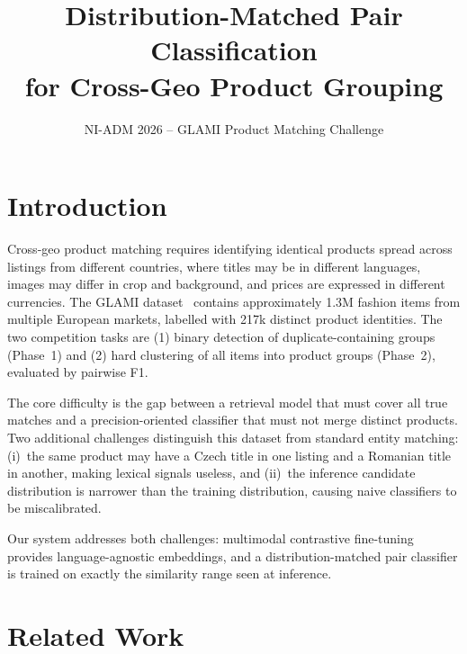 \documentclass[10pt,twocolumn]{article}
\title{\textbf{Distribution-Matched Pair Classification\\for Cross-Geo Product Grouping}}
\author{NI-ADM 2026 -- GLAMI Product Matching Challenge}
\date{}
\begin{document}
\maketitle
\thispagestyle{empty}

\section{Introduction}

Cross-geo product matching requires identifying identical products spread
across listings from different countries, where titles may be in different
languages, images may differ in crop and background, and prices are expressed
in different currencies.
The GLAMI dataset~\cite{glami} contains approximately 1.3M fashion items from
multiple European markets, labelled with 217k distinct product identities.
The two competition tasks are (1) binary detection of duplicate-containing
groups (Phase~1) and (2) hard clustering of all items into product groups
(Phase~2), evaluated by pairwise F1.

The core difficulty is the gap between a retrieval model that must cover all
true matches and a precision-oriented classifier that must not merge distinct
products. Two additional challenges distinguish this dataset from standard
entity matching: (i)~the same product may have a Czech title in one listing
and a Romanian title in another, making lexical signals useless, and (ii)~the
inference candidate distribution is narrower than the training distribution,
causing naive classifiers to be miscalibrated.

Our system addresses both challenges: multimodal contrastive fine-tuning
provides language-agnostic embeddings, and a distribution-matched pair
classifier is trained on exactly the similarity range seen at inference.

\section{Related Work}
\end{document}
